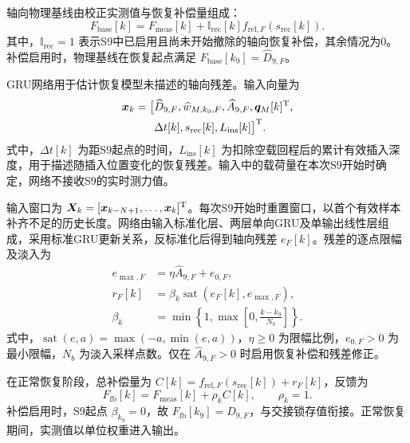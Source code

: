 \documentclass{JQRnew}
\providecommand{\RevisionColor}{\color{black}}
\newcommand{\revbegin}{\begingroup\RevisionColor}
\newcommand{\revend}{\par\endgroup}
\begin{document}
\revbegin
轴向物理基线由校正实测值与恢复补偿量组成：
\begin{equation}
\label{eq:physical-baseline}
F_{\mathrm{base}}[k]=F_{\mathrm{meas}}[k]
+\mathbb I_{\mathrm{rec}}[k]f_{\mathrm{rel},F}(s_{\mathrm{rec}}[k]).
\end{equation}
其中，$\mathbb I_{\mathrm{rec}}=1$ 表示S9中已启用且尚未开始撤除的轴向恢复补偿，其余情况为0。补偿启用时，物理基线在恢复起点满足 $F_{\mathrm{base}}[k_9]=\widehat D_{9,F}$。
\revend

\revbegin
GRU网络用于估计恢复模型未描述的轴向残差。输入向量为
\begin{equation}
\label{eq:gru-input}
\begin{aligned}
\bm x_k=\big[&\widehat D_{9,F},\widehat w_{M,k_9,F},\widehat A_{9,F},
\bm q_M[k]^{\rm T},\\
&\Delta t[k],s_{\mathrm{rec}}[k],L_{\mathrm{ins}}[k]\big]^{\rm T}.
\end{aligned}
\end{equation}
式中，$\Delta t[k]$ 为距S9起点的时间，$L_{\mathrm{ins}}[k]$ 为扣除空载回程后的累计有效插入深度，用于描述随插入位置变化的恢复残差。输入中的载荷量在本次S9开始时确定，网络不接收S9的实时测力值。
\revend

\revbegin
输入窗口为 $\bm X_k=[\bm x_{k-N+1},\ldots,\bm x_k]^{\rm T}$。每次S9开始时重置窗口，以首个有效样本补齐不足的历史长度。网络由输入标准化层、两层单向GRU及单输出线性层组成，采用标准GRU更新关系，反标准化后得到轴向残差 $e_F[k]$。残差的逐点限幅及淡入为
\begin{equation}
\label{eq:residual-limit}
\begin{aligned}
e_{\max,F}&=\eta\widehat A_{9,F}+e_{0,F},\\
r_F[k]&=\beta_k\operatorname{sat}(e_F[k],e_{\max,F}),\\
\beta_k&=\min\!\left\{1,\max\!\left[0,\frac{k-k_9}{N_b}\right]\right\}.
\end{aligned}
\end{equation}
式中，$\operatorname{sat}(e,a)=\max(-a,\min(e,a))$，$\eta\ge0$ 为限幅比例，$e_{0,F}>0$ 为最小限幅，$N_b$ 为淡入采样点数。仅在 $\widehat A_{9,F}>0$ 时启用恢复补偿和残差修正。
\revend

\revbegin
在正常恢复阶段，总补偿量为 $C[k]=f_{\mathrm{rel},F}(s_{\mathrm{rec}}[k])+r_F[k]$，反馈为
\begin{equation}
\label{eq:active-output}
F_{\mathrm{fb}}[k]=F_{\mathrm{meas}}[k]+\rho_kC[k],\qquad \rho_k=1.
\end{equation}
补偿启用时，S9起点 $\beta_{k_9}=0$，故 $F_{\mathrm{fb}}[k_9]=\widehat D_{9,F}$，与交接锁存值衔接。正常恢复期间，实测值以单位权重进入输出。
\revend
\end{document}
